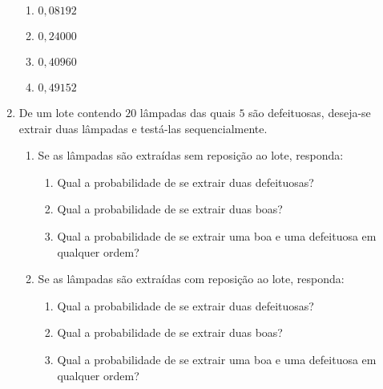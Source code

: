 \begin{enumerate}
\begin{enumerate}
\item {} 
$0{,}08192$

\item {} 
$0{,}24000$

\item {} 
$0{,}40960$

\item {} 
$0{,}49152$

\end{enumerate}

\item De um lote contendo $20$ lâmpadas das quais $5$ são defeituosas, deseja-se extrair duas lâmpadas e testá-las sequencialmente.
\begin{enumerate}
\item {} 
Se as lâmpadas são extraídas sem reposição ao lote, responda:
\begin{enumerate}[label=\roman*)]
\item {} 
Qual a probabilidade de se extrair duas defeituosas?

\item {} 
Qual a probabilidade de se extrair duas boas?

\item {} 
Qual a probabilidade de se extrair uma boa e uma defeituosa em qualquer ordem?

\end{enumerate}

\item {} 
Se as lâmpadas são extraídas com reposição ao lote, responda:

\begin{enumerate}[label=\roman*)]
\item {} 
Qual a probabilidade de se extrair duas defeituosas?

\item {} 
Qual a probabilidade de se extrair duas boas?

\item {} 
Qual a probabilidade de se extrair uma boa e uma defeituosa em qualquer ordem?

\end{enumerate}
\end{enumerate}
\end{enumerate}


\ifnum{}
\clearpage
\else
\notasfinais
\fi




\nocite{*}
